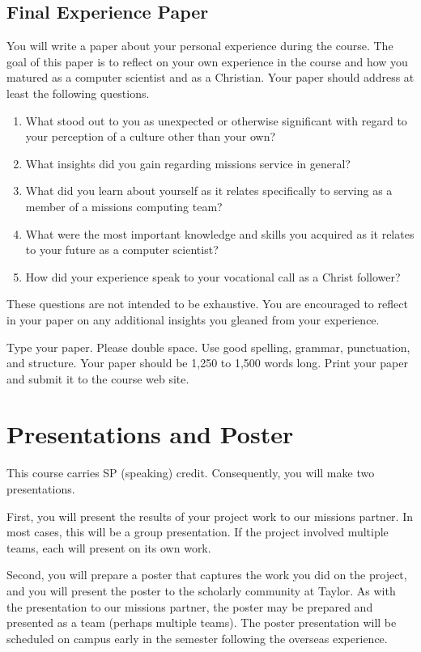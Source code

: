 \documentclass[11pt]{article}
\begin{document}
\subsection{Final Experience Paper}
\label{sec:exp-paper}

You will write a paper about your personal experience during the course.
The goal of this paper is to reflect on your own experience in the course
and how you matured as a computer scientist and as a Christian.
Your paper should address at least the following questions.
\begin{enumerate}
\item
  What stood out to you as unexpected or otherwise significant
  with regard to your perception of a culture other than your own?
\item
  What insights did you gain regarding missions service in general?
\item
  What did you learn about yourself
  as it relates specifically to serving as a member of a missions computing team?
\item
  What were the most important knowledge and skills you acquired
  as it relates to your future as a computer scientist?
\item
  How did your experience speak to your vocational call as a Christ follower?
\end{enumerate}
These questions are not intended to be exhaustive.
You are encouraged to reflect in your paper
on any additional insights you gleaned from your experience.

Type your paper.
Please double space.
Use good spelling, grammar, punctuation, and structure.
Your paper should be 1,250 to 1,500 words long.
Print your paper and submit it to the course web site.

\section{Presentations and Poster}
\label{sec:poster}

This course carries SP (speaking) credit.
Consequently,
you will make two presentations.

First,
you will present the results of your project work
to our missions partner.
In most cases,
this will be a group presentation.
If the project involved multiple teams,
each will present on its own work.

Second,
you will prepare a poster
that captures the work you did on the project,
and you will present the poster
to the scholarly community at Taylor.
As with the presentation to our missions partner,
the poster may be prepared and presented
as a team (perhaps multiple teams).
The poster presentation will be scheduled
on campus
early in the semester following
the overseas experience.
\end{document}
